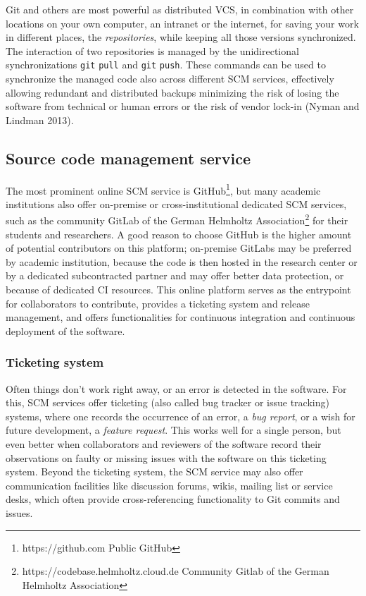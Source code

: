 \documentclass[preprint,11pt,5p]{elsarticle}
\begin{document}
Git and others are most powerful as distributed VCS, in combination with
other locations on your own computer, an intranet or the internet, for
saving your work in different places, the \emph{repositories}, while
keeping all those versions synchronized. The interaction of two
repositories is managed by the unidirectional synchronizations
\texttt{git} \texttt{pull} and \texttt{git} \texttt{push}. These
commands can be used to synchronize the managed code also across
different SCM services, effectively allowing redundant and distributed
backups minimizing the risk of losing the software from technical or
human errors or the risk of vendor lock-in (Nyman and Lindman 2013).

\subsection{Source code management
service}\label{source-code-management-service}

The most prominent online SCM service is GitHub\footnote{https://github.com
  Public GitHub}, but many academic institutions also offer on-premise
or cross-institutional dedicated SCM services, such as the community
GitLab of the German Helmholtz Association\footnote{https://codebase.helmholtz.cloud.de
  Community Gitlab of the German Helmholtz Association} for their
students and researchers. A good reason to choose GitHub is the higher
amount of potential contributors on this platform; on-premise GitLabs
may be preferred by academic institution, because the code is then
hosted in the research center or by a dedicated subcontracted partner
and may offer better data protection, or because of dedicated CI
resources. This online platform serves as the entrypoint for
collaborators to contribute, provides a ticketing system and release
management, and offers functionalities for continuous integration and
continuous deployment of the software.

\subsubsection{Ticketing system}\label{ticketing-system}

Often things don't work right away, or an error is detected in the
software. For this, SCM services offer ticketing (also called bug
tracker or issue tracking) systems, where one records the occurrence of
an error, a \emph{bug report}, or a wish for future development, a
\emph{feature request}. This works well for a single person, but even
better when collaborators and reviewers of the software record their
observations on faulty or missing issues with the software on this
ticketing system. Beyond the ticketing system, the SCM service may also
offer communication facilities like discussion forums, wikis, mailing
list or service desks, which often provide cross-referencing
functionality to Git commits and issues.
\end{document}

